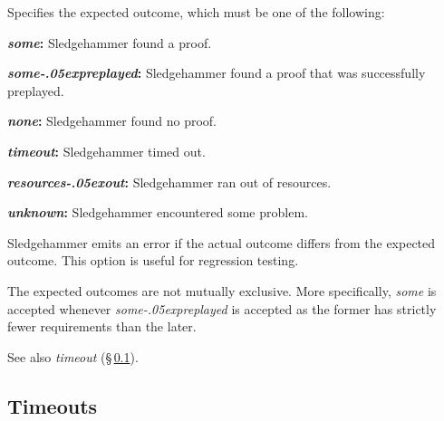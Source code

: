 \documentclass[a4paper,12pt]{article}
\let\oldS=\S
\def\S{\oldS\,}
\renewcommand\_{\hbox{\textunderscore\kern-.05ex}}
\begin{document}
\begin{enum}
Specifies the expected outcome, which must be one of the following:

\begin{enum}
\item[\labelitemi] \textbf{\textit{some}:} Sledgehammer found a proof.
\item[\labelitemi] \textbf{\textit{some\_preplayed}:} Sledgehammer found a proof that was successfully preplayed.
\item[\labelitemi] \textbf{\textit{none}:} Sledgehammer found no proof.
\item[\labelitemi] \textbf{\textit{timeout}:} Sledgehammer timed out.
\item[\labelitemi] \textbf{\textit{resources\_out}:} Sledgehammer ran out of resources.
\item[\labelitemi] \textbf{\textit{unknown}:} Sledgehammer encountered some
problem.
\end{enum}

Sledgehammer emits an error if the actual outcome differs from the expected outcome. This option is
useful for regression testing.

The expected outcomes are not mutually exclusive. More specifically, \textit{some} is accepted
whenever \textit{some\_preplayed} is accepted as the former has strictly fewer requirements
than the later.

\nopagebreak
{\small See also \textit{timeout} (\S\ref{timeouts}).}
\end{enum}


\subsection{Timeouts}
\label{timeouts}
\end{document}
